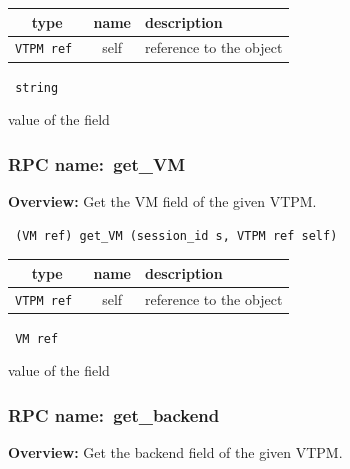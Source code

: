 
 
\vspace{0.3cm}
\begin{tabular}{|c|c|p{7cm}|}
 \hline
{\bf type} & {\bf name} & {\bf description} \\ \hline
{\tt VTPM ref } & self & reference to the object \\ \hline 

\end{tabular}

\vspace{0.3cm}

{\tt 
string
}


value of the field
\vspace{0.3cm}
\vspace{0.3cm}
\vspace{0.3cm}
\subsubsection{RPC name:~get\_VM}

{\bf Overview:} 
Get the VM field of the given VTPM.

\begin{verbatim} (VM ref) get_VM (session_id s, VTPM ref self)\end{verbatim}



 
\vspace{0.3cm}
\begin{tabular}{|c|c|p{7cm}|}
 \hline
{\bf type} & {\bf name} & {\bf description} \\ \hline
{\tt VTPM ref } & self & reference to the object \\ \hline 

\end{tabular}

\vspace{0.3cm}

{\tt 
VM ref
}


value of the field
\vspace{0.3cm}
\vspace{0.3cm}
\vspace{0.3cm}
\subsubsection{RPC name:~get\_backend}

{\bf Overview:} 
Get the backend field of the given VTPM.

